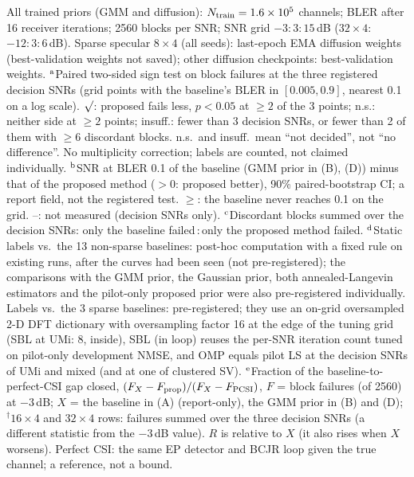 \begin{table}[!t]
\vspace{3pt}
\begin{minipage}{\textwidth}
\footnotesize
All trained priors (GMM and diffusion): $N_{\rm train}=1.6\times10^5$ channels; BLER after 16 receiver iterations; 2560 blocks per SNR; SNR grid $-3{:}3{:}15$\,dB ($32\times4$: $-12{:}3{:}6$\,dB). Sparse specular $8\times4$ (all seeds): last-epoch EMA diffusion weights (best-validation weights not saved); other diffusion checkpoints: best-validation weights.
$^{\rm a}$Paired two-sided sign test on block failures at the three registered decision SNRs (grid points with the baseline's BLER in $[0.005,0.9]$, nearest 0.1 on a log scale). $\surd$: proposed fails less, $p<0.05$ at $\geq2$ of the 3 points; n.s.: neither side at $\geq2$ points; insuff.: fewer than 3 decision SNRs, or fewer than 2 of them with $\geq6$ discordant blocks. n.s.\ and insuff.\ mean ``not decided'', not ``no difference''. No multiplicity correction; labels are counted, not claimed individually.
$^{\rm b}$SNR at BLER 0.1 of the baseline (GMM prior in (B), (D)) minus that of the proposed method ($>0$: proposed better), 90\% paired-bootstrap CI; a report field, not the registered test. $\geq$: the baseline never reaches 0.1 on the grid. --: not measured (decision SNRs only).
$^{\rm c}$Discordant blocks summed over the decision SNRs: only the baseline failed\,:\,only the proposed method failed.
$^{\rm d}$Static labels vs.\ the 13 non-sparse baselines: post-hoc computation with a fixed rule on existing runs, after the curves had been seen (not pre-registered); the comparisons with the GMM prior, the Gaussian prior, both annealed-Langevin estimators and the pilot-only proposed prior were also pre-registered individually. Labels vs.\ the 3 sparse baselines: pre-registered; they use an on-grid oversampled 2-D DFT dictionary with oversampling factor 16 at the edge of the tuning grid (SBL at UMi: 8, inside), SBL (in loop) reuses the per-SNR iteration count tuned on pilot-only development NMSE, and OMP equals pilot LS at the decision SNRs of UMi and mixed (and at one of clustered SV).
$^{\rm e}$Fraction of the baseline-to-perfect-CSI gap closed, $(F_X-F_{\rm prop})/(F_X-F_{\rm PCSI})$, $F$ = block failures (of 2560) at $-3$\,dB; $X$ = the baseline in (A) (report-only), the GMM prior in (B) and (D); $^{\dagger}$$16\times4$ and $32\times4$ rows: failures summed over the three decision SNRs (a different statistic from the $-3$\,dB value). $R$ is relative to $X$ (it also rises when $X$ worsens). Perfect CSI: the same EP detector and BCJR loop given the true channel; a reference, not a bound.
$$
\end{minipage}
\end{table}
